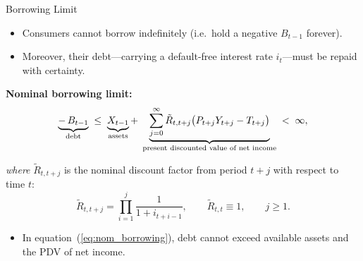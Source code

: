\documentclass[11pt,aspectratio=169]{beamer}
\begin{document}
\begin{frame}{Borrowing Limit}
\small

\begin{itemize}
  \item Consumers cannot borrow indefinitely (i.e.\ hold a negative $B_{t-1}$ forever).
  \item Moreover, their debt—carrying a default-free interest rate $i_t$—must be repaid with certainty.
\end{itemize}

\vspace{0.25cm}
\noindent\textbf{Nominal borrowing limit:}
\begin{equation}
\underbrace{-\,B_{t-1}}_{\text{\scriptsize debt}}
\;\le\;
\underbrace{X_{t-1}}_{\text{\scriptsize assets}}
+\;
\underbrace{\sum_{j=0}^{\infty} 
\tilde{R}_{t,t+j}\big(P_{t+j}Y_{t+j}-T_{t+j}\big)}_{\text{\scriptsize present discounted value of net income}}
\;<\;\infty,
\label{eq:nom_borrowing}
\end{equation}

\hspace{0.6cm}\textit{where} $\tilde{R}_{t,t+j}$ is the nominal discount factor from period $t+j$ with respect to time $t$:
\begin{equation}
\tilde{R}_{t,t+j}
= \prod_{i=1}^{j} \frac{1}{1 + i_{t+i-1}},
\qquad 
\tilde{R}_{t,t} \equiv 1,
\qquad 
j \ge 1.
\label{eq:nom_discount_fac}
\end{equation}

\begin{itemize}
  \item In equation~(\ref{eq:nom_borrowing}), debt cannot exceed available assets and the PDV of net income.
\end{itemize}

\end{frame}
\end{document}
